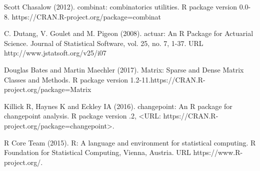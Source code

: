 \begin{thebibliography}{00}
 Scott Chasalow (2012). 
\newblock combinat: combinatorics utilities. 
\newblock R package version 0.0-8. https://CRAN.R-project.org/package=combinat

 C. Dutang, V. Goulet and M. Pigeon (2008). 
\newblock actuar: An R Package for Actuarial Science. 
\newblock Journal of Statistical Software, vol. 25, no. 7, 1-37. URL http://www.jstatsoft.org/v25/i07

 Douglas Bates and Martin Maechler (2017). 
\newblock Matrix: Sparse and Dense Matrix Classes and Methods. 
\newblock R package version 1.2-11.https://CRAN.R-project.org/package=Matrix

 Killick R, Haynes K and Eckley IA (2016).
\newblock changepoint: An R package for changepoint analysis. R package version
.2, <URL: https://CRAN.R-project.org/package=changepoint>.

R Core Team (2015). 
\newblock R: A language and environment for statistical computing. R Foundation for Statistical Computing, Vienna, Austria.
\newblock URL https://www.R-project.org/.

\end{thebibliography}

